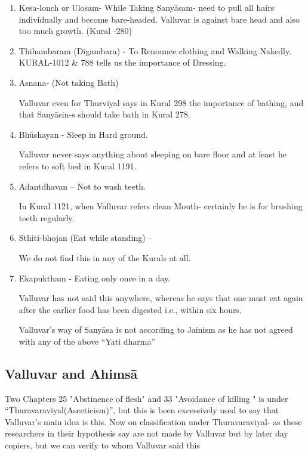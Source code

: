 \begin{enumerate}[{\rm 1)}]
\itemsep=0pt
\item Kesa-lonch or Ulosam- While Taking Sanyāsam- need to pull all hairs individually and become bare-headed. Valluvar is against bare head and also too much growth. (Kural -280)
 
 \item Thihambaram (Digambara) - To Renounce clothing and Walking Nakedly. KURAL-1012 \& 788 tells us the importance of Dressing.
 
 \item 
 Asnana- (Not taking Bath)

 Valluvar even for Thurviyal says in Kural 298 the importance of bathing, and that Sanyāsin-s should take bath in Kural 278.

 \item 
 Bhūshayan - Sleep in Hard ground.

 Valluvar never says anything about sleeping on bare floor and at least he refers to soft bed in Kural 1191.

 \item 
 Adantdhavan – Not to wash teeth.

 In Kural 1121, when Valluvar refers clean Mouth- certainly he is for brushing teeth regularly.

 \item 
 Sthiti-bhojan (Eat while standing) –

 We do not find this in any of the Kurals at all.

 \item 
 Ekapuktham - Eating only once in a day.

 Valluvar has not said this anywhere, whereas he says that one must eat again after the earlier food has been digested i.e., within six hours.

 Valluvar’s way of Sanyāsa is not according to Jainism as he has not agreed with any of the above “Yati dharma”

\end{enumerate}


\subsection*{Valluvar and Ahimsā}

Two Chapters 25 "Abstinence of flesh" and 33 "Avoidance of killing " is under “Thuravaraviyal(Asceticism)”, but this is been excessively used to say that Valluvar’s main idea is this. Now on classification under Thuravaraviyal- as these researchers in their hypothesis say are not made by Valluvar but by later day copiers, but we can verify to whom Valluvar said this

